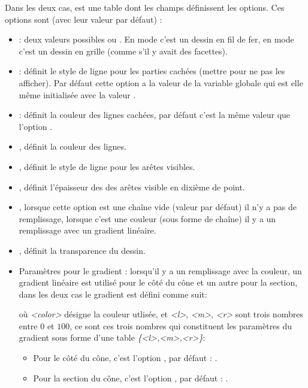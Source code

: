 Dans les deux cas,  est une table dont les champs définissent les options. Ces options sont (avec leur valeur par défaut) :
\begin{itemize}
    \item {} : deux valeurs possibles  ou . En mode  c'est un dessin en fil de fer, en mode  c'est un dessin en grille (comme s'il y avait des facettes).
    
    \item {} : définit le style de ligne pour les parties cachées (mettre  pour ne pas les afficher). Par défaut cette option a la valeur de la variable globale  qui est elle même initialisée avec la valeur .
    
    \item {}: définit la couleur des lignes cachées, par défaut c'est la même valeur que l'option .
    
    \item {}, définit la couleur des lignes.
    
    \item {}, définit le style de ligne pour les arêtes visibles.

    \item {}, définit l'épaisseur des des arêtes visible en dixième de point.
    
    \item {}, lorsque cette option est une chaîne vide (valeur par défaut) il n'y a pas de remplissage,  lorsque c'est une couleur (sous forme de chaîne) il y a un remplissage avec un gradient linéaire.
    
    \item {}, définit la transparence du dessin.
    
    \item Paramètres pour le gradient : lorsqu'il y a un remplissage avec la couleur, un gradient linéaire est utilisé pour le côté du cône et un autre pour la section, dans les deux cas le gradient est défini comme suit:\par
    où \emph{<color>} désigne la couleur utlisée, et \emph{<l>}, \emph{<m>}, \emph{<r>} sont trois nombres entre $0$ et $100$, ce sont ces trois nombres qui constituent les paramètres du gradient sous forme d'une table \emph{\{<l>,<m>,<r>\}}:
        \begin{itemize}
            \item Pour le côté du cône, c'est l'option , par défaut : .
            \item Pour la section du cône, c'est l'option , par défaut : .
        \end{itemize}
\end{itemize}

